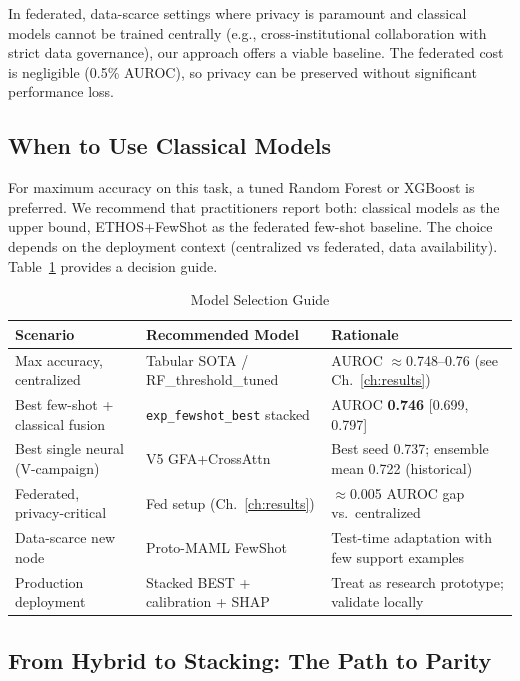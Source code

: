 In federated, data-scarce settings where privacy is paramount and classical models cannot be trained centrally (e.g., cross-institutional collaboration with strict data governance), our approach offers a viable baseline. The federated cost is negligible (0.5\% AUROC), so privacy can be preserved without significant performance loss.

\subsection{When to Use Classical Models}

For maximum accuracy on this task, a tuned Random Forest or XGBoost is preferred. We recommend that practitioners report both: classical models as the upper bound, ETHOS+FewShot as the federated few-shot baseline. The choice depends on the deployment context (centralized vs federated, data availability). Table~\ref{tab:model_selection} provides a decision guide.

\begin{table}[htbp]
\centering
\caption{Model Selection Guide}
\small
\begin{tabular}{llp{5cm}}
\toprule
Scenario & Recommended Model & Rationale \\
\midrule
Max accuracy, centralized & Tabular SOTA / RF\_threshold\_tuned & AUROC $\approx$0.748--0.76 (see Ch.~\ref{ch:results}) \\
Best few-shot + classical fusion & \texttt{exp\_fewshot\_best} stacked & AUROC \textbf{0.746} [0.699, 0.797] \\
Best single neural (V-campaign) & V5 GFA+CrossAttn & Best seed 0.737; ensemble mean 0.722 (historical) \\
Federated, privacy-critical & Fed setup (Ch.~\ref{ch:results}) & $\approx$0.005 AUROC gap vs.\ centralized \\
Data-scarce new node & Proto-MAML FewShot & Test-time adaptation with few support examples \\
Production deployment & Stacked BEST + calibration + SHAP & Treat as research prototype; validate locally \\
\bottomrule
\end{tabular}
\label{tab:model_selection}
\end{table}

\subsection{From Hybrid to Stacking: The Path to Parity}


